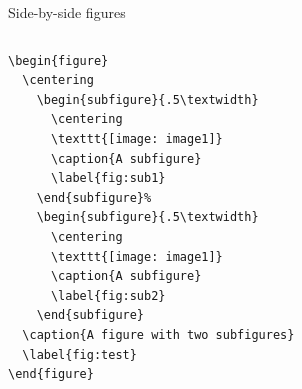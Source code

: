 \documentclass[aspectratio=169]{beamer}
\begin{document}
	\begin{frame}[fragile]{Side-by-side figures}
	\begin{center}
	\end{center}
	
	\begin{columns}
	{\tiny
		\begin{verbatim}
\begin{figure}
  \centering
    \begin{subfigure}{.5\textwidth}
      \centering
      \texttt{[image: image1]}
      \caption{A subfigure}
      \label{fig:sub1}
    \end{subfigure}%
    \begin{subfigure}{.5\textwidth}
      \centering
      \texttt{[image: image1]}
      \caption{A subfigure}
      \label{fig:sub2}
    \end{subfigure}
  \caption{A figure with two subfigures}
  \label{fig:test}
\end{figure}
		\end{verbatim}
	}

	

\end{columns}
\end{frame}
\end{document}
